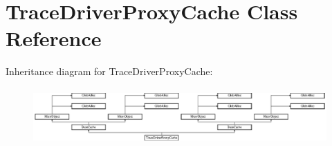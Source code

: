 \hypertarget{classTraceDriverProxyCache}{\section{Trace\-Driver\-Proxy\-Cache Class Reference}
\label{classTraceDriverProxyCache}
}
Inheritance diagram for Trace\-Driver\-Proxy\-Cache\-:\begin{figure}[H]
\begin{center}
\leavevmode
\includegraphics[height=2.201258cm]{classTraceDriverProxyCache}
\end{center}
\end{figure}
